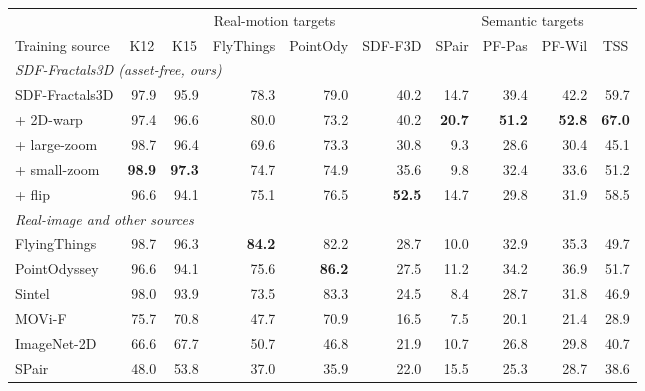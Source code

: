 \begin{tabular}{l rrrrr rrrr}
\toprule
 & \multicolumn{5}{c}{Real-motion targets} & \multicolumn{4}{c}{Semantic targets} \\
\cmidrule(lr){2-6}\cmidrule(lr){7-10}
Training source & \multicolumn{1}{c}{K12} & \multicolumn{1}{c}{K15} & \multicolumn{1}{c}{FlyThings} & \multicolumn{1}{c}{PointOdy} & \multicolumn{1}{c}{SDF-F3D} & \multicolumn{1}{c}{SPair} & \multicolumn{1}{c}{PF-Pas} & \multicolumn{1}{c}{PF-Wil} & \multicolumn{1}{c}{TSS} \\
\midrule
\multicolumn{10}{l}{\emph{SDF-Fractals3D (asset-free, ours)}} \\
SDF-Fractals3D & 97.9 & 95.9 & 78.3 & 79.0 & 40.2 & 14.7 & 39.4 & 42.2 & 59.7 \\
\quad + 2D-warp & 97.4 & 96.6 & 80.0 & 73.2 & 40.2 & \textbf{20.7} & \textbf{51.2} & \textbf{52.8} & \textbf{67.0} \\
\quad + large-zoom & 98.7 & 96.4 & 69.6 & 73.3 & 30.8 & 9.3 & 28.6 & 30.4 & 45.1 \\
\quad + small-zoom & \textbf{98.9} & \textbf{97.3} & 74.7 & 74.9 & 35.6 & 9.8 & 32.4 & 33.6 & 51.2 \\
\quad + flip & 96.6 & 94.1 & 75.1 & 76.5 & \textbf{52.5} & 14.7 & 29.8 & 31.9 & 58.5 \\
\midrule
\multicolumn{10}{l}{\emph{Real-image and other sources}} \\
FlyingThings & 98.7 & 96.3 & \textbf{84.2} & 82.2 & 28.7 & 10.0 & 32.9 & 35.3 & 49.7 \\
PointOdyssey & 96.6 & 94.1 & 75.6 & \textbf{86.2} & 27.5 & 11.2 & 34.2 & 36.9 & 51.7 \\
Sintel & 98.0 & 93.9 & 73.5 & 83.3 & 24.5 & 8.4 & 28.7 & 31.8 & 46.9 \\
MOVi-F & 75.7 & 70.8 & 47.7 & 70.9 & 16.5 & 7.5 & 20.1 & 21.4 & 28.9 \\
ImageNet-2D & 66.6 & 67.7 & 50.7 & 46.8 & 21.9 & 10.7 & 26.8 & 29.8 & 40.7 \\
SPair & 48.0 & 53.8 & 37.0 & 35.9 & 22.0 & 15.5 & 25.3 & 28.7 & 38.6 \\
\bottomrule
\end{tabular}
